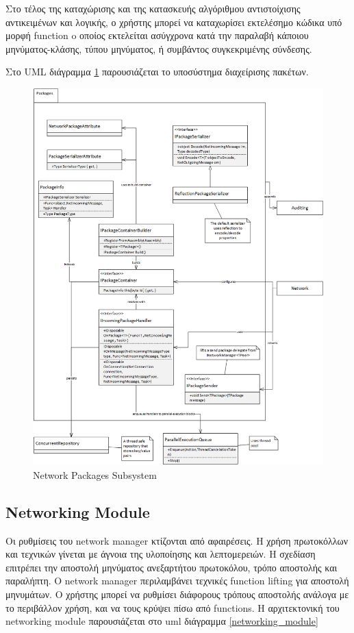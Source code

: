 			Στο τέλος της καταχώρισης και της κατασκευής αλγόριθμου αντιστοίχισης αντικειμένων και λογικής, ο χρήστης μπορεί να καταχωρίσει εκτελέσημο κώδικα υπό μορφή function o οποίος εκτελείται ασύγχρονα κατά την παραλαβή κάποιου μηνύματος-κλάσης, τύπου μηνύματος, ή συμβάντος συγκεκριμένης σύνδεσης.
			
			Στο UML διάγραμμα \ref{network_packages} παρουσιάζεται το υποσύστημα διαχείρισης πακέτων.
			\begin{figure}
				\centering
				\includegraphics[width=165mm]{Images/network_architecture_packages}
				\caption{Network Packages Subsystem}
				\label{network_packages}
			\end{figure}	
					
			\subsection{Networking Module}	 					
			
			Οι ρυθμίσεις του network manager κτίζονται από αφαιρέσεις. Η χρήση πρωτοκόλλων και τεχνικών γίνεται με άγνοια της υλοποίησης και λεπτομερειών.
			Η σχεδίαση επιτρέπει την αποστολή μηνύματος ανεξαρτήτου πρωτοκόλου, τρόπο αποστολής και παραλήπτη. Ο network manager περιλαμβάνει τεχνικές function lifting για αποστολή μηνυμάτων. Ο χρήστης μπορεί να ρυθμίσει διάφορους τρόπους αποστολής ανάλογα με το περιβάλλον χρήση, και να τους κρύψει πίσω από functions. Η αρχιτεκτονική του networking module παρουσιάζεται στο uml διάγραμμα \ref{networking_module}
						
